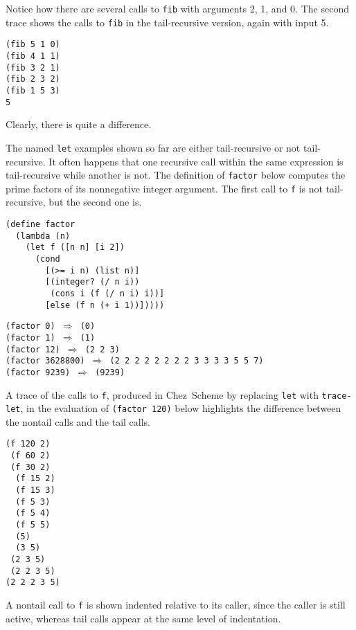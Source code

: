 Notice how there are several calls to \texttt{fib} with arguments 2, 1, and 0.
The second trace shows the calls to \texttt{fib} in the tail-recursive version,
again with input 5.


\begin{alltt}
\textbar{}(fib 5 1 0)
\textbar{}(fib 4 1 1)
\textbar{}(fib 3 2 1)
\textbar{}(fib 2 3 2)
\textbar{}(fib 1 5 3)
\textbar{}5
\end{alltt}


Clearly, there is quite a difference.


The \label{further_s50}named \texttt{let} examples shown so far are either tail-recursive or not
tail-recursive.
It often happens that one recursive call within the same expression is
tail-recursive while another is not.
The definition of \label{further_s51}\texttt{factor} below computes the prime factors of its
nonnegative integer argument.
The first call to \texttt{f} is not
tail-recursive, but the second one is.


\begin{alltt}
(define factor
  (lambda (n)
    (let f ([n n] [i 2])
      (cond
        [(\textgreater{}= i n) (list n)]
        [(integer? (/ n i))
         (cons i (f (/ n i) i))]
        [else (f n (+ i 1))]))))

(factor 0) \(\Rightarrow\) (0)
(factor 1) \(\Rightarrow\) (1)
(factor 12) \(\Rightarrow\) (2 2 3)
(factor 3628800) \(\Rightarrow\) (2 2 2 2 2 2 2 2 3 3 3 3 5 5 7)
(factor 9239) \(\Rightarrow\) (9239)
\end{alltt}


A trace of the calls to \texttt{f}, produced in Chez Scheme by
replacing \texttt{let} with \texttt{trace-let},
in the evaluation of \texttt{(factor 120)}
below highlights the difference between the nontail calls and the
tail calls.


\begin{alltt}
\textbar{}(f 120 2)
\textbar{} (f 60 2)
\textbar{} \textbar{}(f 30 2)
\textbar{} \textbar{} (f 15 2)
\textbar{} \textbar{} (f 15 3)
\textbar{} \textbar{} \textbar{}(f 5 3)
\textbar{} \textbar{} \textbar{}(f 5 4)
\textbar{} \textbar{} \textbar{}(f 5 5)
\textbar{} \textbar{} \textbar{}(5)
\textbar{} \textbar{} (3 5)
\textbar{} \textbar{}(2 3 5)
\textbar{} (2 2 3 5)
\textbar{}(2 2 2 3 5)
\end{alltt}


A nontail call to \texttt{f} is shown indented relative to its caller,
since the caller is still active, whereas tail calls appear at
the same level of indentation.


